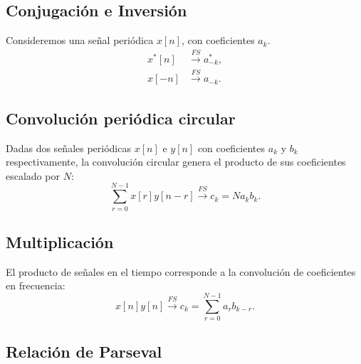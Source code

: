 \subsection{Conjugación e Inversión}

Consideremos una señal periódica $x[n]$, con coeficientes $a_{k}$. 
\begin{align}
	x^*[n] &\xrightarrow{FS} a_{-k}^*, \\
	x[-n] &\xrightarrow{FS} a_{-k}.
\end{align}

\subsection{Convolución periódica circular}

Dadas dos señales periódicas $x[n]$ e $y[n]$ con coeficientes $a_k$ y $b_k$ respectivamente, la convolución circular genera el producto de sus coeficientes escalado por $N$:
\begin{equation}
	\sum_{r=0}^{N-1} x[r] y[n-r] \xrightarrow{FS} c_{k} = N a_{k} b_{k}.
\end{equation}

\subsection{Multiplicación}

El producto de señales en el tiempo corresponde a la convolución de coeficientes en frecuencia:
\begin{equation}
	x[n] y[n] \xrightarrow{FS} c_{k} = \sum_{r=0}^{N-1} a_{r} b_{k-r}.
\end{equation}

\subsection{Relación de Parseval}

